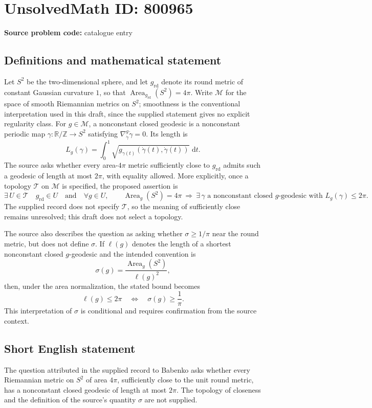 \documentclass[11pt]{article}
\newcommand{\Z}{\mathbb{Z}}
\newcommand{\R}{\mathbb{R}}
\newcommand{\dd}{\,\mathrm{d}}
\begin{document}
\section*{UnsolvedMath ID: 800965}
\textbf{Source problem code:} catalogue entry
\subsection{Definitions and mathematical statement}
Let \(S^2\) be the two-dimensional sphere, and let \(g_{\mathrm{rd}}\) denote its round metric of constant Gaussian curvature \(1\), so that \(\operatorname{Area}_{g_{\mathrm{rd}}}(S^2)=4\pi\). Write \(\mathcal M\) for the space of smooth Riemannian metrics on \(S^2\); smoothness is the conventional interpretation used in this draft, since the supplied statement gives no explicit regularity class. For \(g\in\mathcal M\), a nonconstant closed geodesic is a nonconstant periodic map \(\gamma:\R/\Z\to S^2\) satisfying \(\nabla^g_{\dot\gamma}\dot\gamma=0\). Its length is
\[
L_g(\gamma)=\int_0^1\sqrt{g_{\gamma(t)}(\dot\gamma(t),\dot\gamma(t))}\,\dd t.
\]
The source asks whether every area-\(4\pi\) metric sufficiently close to \(g_{\mathrm{rd}}\) admits such a geodesic of length at most \(2\pi\), with equality allowed. More explicitly, once a topology \(\mathcal T\) on \(\mathcal M\) is specified, the proposed assertion is
\[
\exists\,U\in\mathcal T\quad g_{\mathrm{rd}}\in U\quad\text{and}\quad
\forall g\in U,\qquad
\operatorname{Area}_g(S^2)=4\pi
\ \Longrightarrow\ 
\exists\,\gamma\text{ a nonconstant closed }g\text{-geodesic with }L_g(\gamma)\leq2\pi.
\]
The supplied record does not specify \(\mathcal T\), so the meaning of sufficiently close remains unresolved; this draft does not select a topology.

The source also describes the question as asking whether \(\sigma\geq1/\pi\) near the round metric, but does not define \(\sigma\). If \(\ell(g)\) denotes the length of a shortest nonconstant closed \(g\)-geodesic and the intended convention is
\[
\sigma(g)=\frac{\operatorname{Area}_g(S^2)}{\ell(g)^2},
\]
then, under the area normalization, the stated bound becomes
\[
\ell(g)\leq2\pi\quad\Longleftrightarrow\quad\sigma(g)\geq\frac1\pi.
\]
This interpretation of \(\sigma\) is conditional and requires confirmation from the source context.
\subsection{Short English statement}
The question attributed in the supplied record to Babenko asks whether every Riemannian metric on \(S^2\) of area \(4\pi\), sufficiently close to the unit round metric, has a nonconstant closed geodesic of length at most \(2\pi\). The topology of closeness and the definition of the source's quantity \(\sigma\) are not supplied.
\end{document}
